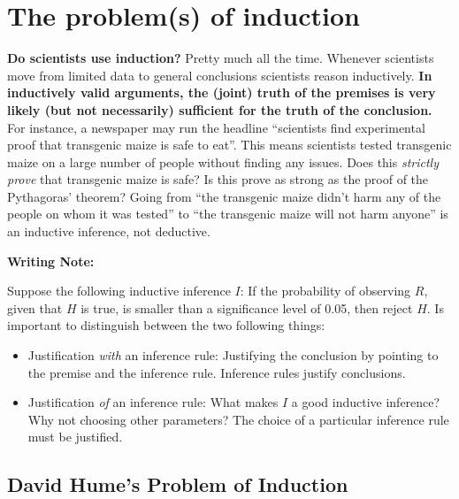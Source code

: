\documentclass[
]{book}
\providecommand{\tightlist}{%
  \setlength{\itemsep}{0pt}\setlength{\parskip}{0pt}}
\begin{document}
\hypertarget{problem-induction}{%
\section{The problem(s) of induction}\label{problem-induction}}

\textbf{Do scientists use induction?} Pretty much all the time. Whenever scientists move from limited data to general conclusions scientists reason inductively. \textbf{In inductively valid arguments, the (joint) truth of the premises is very likely (but not necessarily) sufficient for the truth of the conclusion.} For instance, a newspaper may run the headline ``scientists find experimental proof that transgenic maize is safe to eat''. This means scientists tested transgenic maize on a large number of people without finding any issues. Does this \emph{strictly prove} that transgenic maize is safe? Is this prove as strong as the proof of the Pythagoras' theorem? Going from ``the transgenic maize didn't harm any of the people on whom it was tested'' to ``the transgenic maize will not harm anyone'' is an inductive inference, not deductive.

\begin{tipbox}

\textbf{Writing Note:}

Suppose the following inductive inference \(I\): If the probability of observing \(R\), given that \(H\) is true, is smaller than a significance level of 0.05, then reject \(H\). Is important to distinguish between the two following things:

\begin{itemize}
\tightlist
\item
  Justification \emph{with} an inference rule: Justifying the conclusion by pointing to the premise and the inference rule. Inference rules justify conclusions.
\item
  Justification \emph{of} an inference rule: What makes \(I\) a good inductive inference? Why not choosing other parameters? The choice of a particular inference rule must be justified.
\end{itemize}

\end{tipbox}

\hypertarget{david-humes-problem-of-induction}{%
\subsection{David Hume's Problem of Induction}\label{david-humes-problem-of-induction}}
\end{document}

